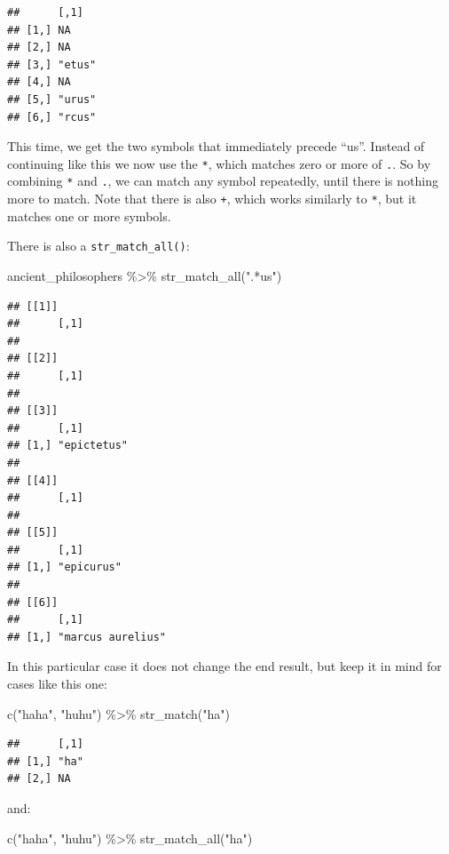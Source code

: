 \documentclass[
]{article}
\newenvironment{Shaded}{\begin{snugshade}}{\end{snugshade}}
\newcommand{\FunctionTok}[1]{\textcolor[rgb]{0.00,0.00,0.00}{#1}}
\newcommand{\NormalTok}[1]{#1}
\newcommand{\SpecialCharTok}[1]{\textcolor[rgb]{0.00,0.00,0.00}{#1}}
\newcommand{\StringTok}[1]{\textcolor[rgb]{0.31,0.60,0.02}{#1}}
\begin{document}
\begin{verbatim}
##      [,1]  
## [1,] NA    
## [2,] NA    
## [3,] "etus"
## [4,] NA    
## [5,] "urus"
## [6,] "rcus"
\end{verbatim}

This time, we get the two symbols that immediately precede ``us''. Instead of continuing like this
we now use the \texttt{*}, which matches zero or more of \texttt{.}. So by combining \texttt{*} and \texttt{.}, we can match
any symbol repeatedly, until there is nothing more to match. Note that there is also \texttt{+}, which works
similarly to \texttt{*}, but it matches one or more symbols.

There is also a \texttt{str\_match\_all()}:

\begin{Shaded}
\begin{Highlighting}[]
\NormalTok{ancient\_philosophers }\SpecialCharTok{\%\textgreater{}\%}
  \FunctionTok{str\_match\_all}\NormalTok{(}\StringTok{".*us"}\NormalTok{)}
\end{Highlighting}
\end{Shaded}

\begin{verbatim}
## [[1]]
##      [,1]
## 
## [[2]]
##      [,1]
## 
## [[3]]
##      [,1]       
## [1,] "epictetus"
## 
## [[4]]
##      [,1]
## 
## [[5]]
##      [,1]      
## [1,] "epicurus"
## 
## [[6]]
##      [,1]             
## [1,] "marcus aurelius"
\end{verbatim}

In this particular case it does not change the end result, but keep it in mind for cases like this one:

\begin{Shaded}
\begin{Highlighting}[]
\FunctionTok{c}\NormalTok{(}\StringTok{"haha"}\NormalTok{, }\StringTok{"huhu"}\NormalTok{) }\SpecialCharTok{\%\textgreater{}\%}
  \FunctionTok{str\_match}\NormalTok{(}\StringTok{"ha"}\NormalTok{)}
\end{Highlighting}
\end{Shaded}

\begin{verbatim}
##      [,1]
## [1,] "ha"
## [2,] NA
\end{verbatim}

and:

\begin{Shaded}
\begin{Highlighting}[]
\FunctionTok{c}\NormalTok{(}\StringTok{"haha"}\NormalTok{, }\StringTok{"huhu"}\NormalTok{) }\SpecialCharTok{\%\textgreater{}\%}
  \FunctionTok{str\_match\_all}\NormalTok{(}\StringTok{"ha"}\NormalTok{)}
\end{Highlighting}
\end{Shaded}
\end{document}
